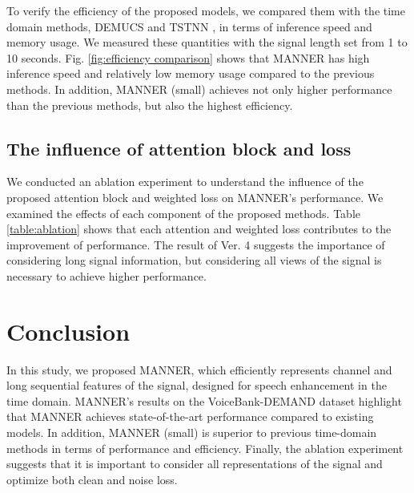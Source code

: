 \documentclass{article}
\begin{document}
To verify the efficiency of the proposed models, we compared them with the time domain methods, DEMUCS \cite{defossez2020real} and TSTNN \cite{wang2021tstnn}, in terms of inference speed and memory usage. We measured these quantities with the signal length set from 1 to 10 seconds. Fig. \ref{fig:efficiency comparison} shows that MANNER has high inference speed and relatively low memory usage compared to the previous methods. In addition, MANNER (small) achieves not only higher performance than the previous methods, but also the highest efficiency.
\begin{table}[h]
\centering
\caption{Comparison results depending on attention types and weighted loss (wLoss).}
\label{table:ablation}
\end{table}
\subsection{The influence of attention block and loss}
\label{sec:ablation}

We conducted an ablation experiment to understand the influence of the proposed attention block and weighted loss on MANNER’s performance. We examined the effects of each component of the proposed methods. Table \ref{table:ablation} shows that each attention and weighted loss contributes to the improvement of performance. The result of Ver. 4 suggests the importance of considering long signal information, but considering all views of the signal is necessary to achieve higher performance. 

\section{Conclusion}
\label{sec:con}
In this study, we proposed MANNER, which efficiently represents channel and long sequential features of the signal, designed for speech enhancement in the time domain. MANNER’s results on the VoiceBank-DEMAND dataset highlight that MANNER achieves state-of-the-art performance compared to existing models. In addition, MANNER (small) is superior to previous time-domain methods in terms of performance and efficiency. Finally, the ablation experiment suggests that it is important to consider all representations of the signal and optimize both clean and noise loss.



\end{document}
